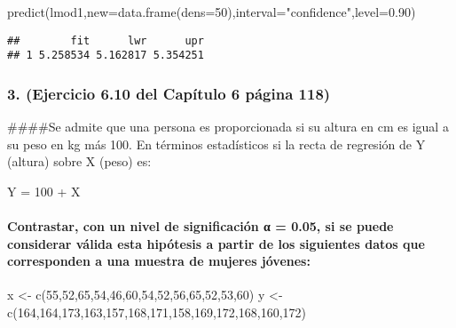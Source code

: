 \documentclass[
]{article}
\newenvironment{Shaded}{\begin{snugshade}}{\end{snugshade}}
\newcommand{\AttributeTok}[1]{\textcolor[rgb]{0.77,0.63,0.00}{#1}}
\newcommand{\DecValTok}[1]{\textcolor[rgb]{0.00,0.00,0.81}{#1}}
\newcommand{\FloatTok}[1]{\textcolor[rgb]{0.00,0.00,0.81}{#1}}
\newcommand{\FunctionTok}[1]{\textcolor[rgb]{0.00,0.00,0.00}{#1}}
\newcommand{\NormalTok}[1]{#1}
\newcommand{\OtherTok}[1]{\textcolor[rgb]{0.56,0.35,0.01}{#1}}
\newcommand{\StringTok}[1]{\textcolor[rgb]{0.31,0.60,0.02}{#1}}
\begin{document}
\begin{Shaded}
\begin{Highlighting}[]
 \FunctionTok{predict}\NormalTok{(lmod1,}\AttributeTok{new=}\FunctionTok{data.frame}\NormalTok{(}\AttributeTok{dens=}\DecValTok{50}\NormalTok{),}\AttributeTok{interval=}\StringTok{"confidence"}\NormalTok{,}\AttributeTok{level=}\FloatTok{0.90}\NormalTok{)}
\end{Highlighting}
\end{Shaded}

\begin{verbatim}
##        fit      lwr      upr
## 1 5.258534 5.162817 5.354251
\end{verbatim}

\hypertarget{ejercicio-6.10-del-capuxedtulo-6-puxe1gina-118}{%
\subsubsection{3. (Ejercicio 6.10 del Capítulo 6 página
118)}\label{ejercicio-6.10-del-capuxedtulo-6-puxe1gina-118}}

\#\#\#\#Se admite que una persona es proporcionada si su altura en cm es
igual a su peso en kg más 100. En términos estadísticos si la recta de
regresión de Y (altura) sobre X (peso) es:

Y = 100 + X

\hypertarget{contrastar-con-un-nivel-de-significaciuxf3n-ux3b1-0.05-si-se-puede-considerar-vuxe1lida-esta-hipuxf3tesis-a-partir-de-los-siguientes-datos-que-corresponden-a-una-muestra-de-mujeres-juxf3venes}{%
\paragraph{Contrastar, con un nivel de significación α = 0.05, si se
puede considerar válida esta hipótesis a partir de los siguientes datos
que corresponden a una muestra de mujeres
jóvenes:}\label{contrastar-con-un-nivel-de-significaciuxf3n-ux3b1-0.05-si-se-puede-considerar-vuxe1lida-esta-hipuxf3tesis-a-partir-de-los-siguientes-datos-que-corresponden-a-una-muestra-de-mujeres-juxf3venes}}

\begin{Shaded}
\begin{Highlighting}[]
\NormalTok{x }\OtherTok{\textless{}{-}} \FunctionTok{c}\NormalTok{(}\DecValTok{55}\NormalTok{,}\DecValTok{52}\NormalTok{,}\DecValTok{65}\NormalTok{,}\DecValTok{54}\NormalTok{,}\DecValTok{46}\NormalTok{,}\DecValTok{60}\NormalTok{,}\DecValTok{54}\NormalTok{,}\DecValTok{52}\NormalTok{,}\DecValTok{56}\NormalTok{,}\DecValTok{65}\NormalTok{,}\DecValTok{52}\NormalTok{,}\DecValTok{53}\NormalTok{,}\DecValTok{60}\NormalTok{)}
\NormalTok{y }\OtherTok{\textless{}{-}} \FunctionTok{c}\NormalTok{(}\DecValTok{164}\NormalTok{,}\DecValTok{164}\NormalTok{,}\DecValTok{173}\NormalTok{,}\DecValTok{163}\NormalTok{,}\DecValTok{157}\NormalTok{,}\DecValTok{168}\NormalTok{,}\DecValTok{171}\NormalTok{,}\DecValTok{158}\NormalTok{,}\DecValTok{169}\NormalTok{,}\DecValTok{172}\NormalTok{,}\DecValTok{168}\NormalTok{,}\DecValTok{160}\NormalTok{,}\DecValTok{172}\NormalTok{)}
\end{Highlighting}
\end{Shaded}
\end{document}
